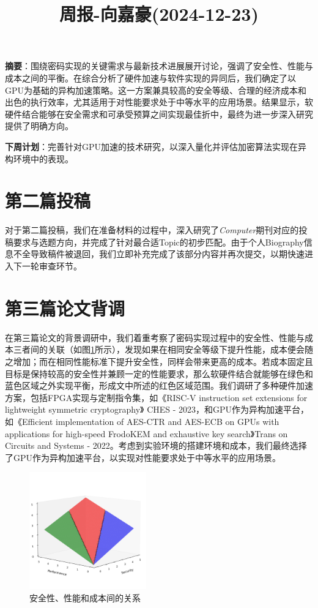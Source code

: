 \documentclass[11pt,a4paper]{article}
\title{周报-向嘉豪(2024-12-23)}
\renewcommand{\maketitle}{
  \begin{center}
    \LARGE\bfseries\thetitle
  \end{center}
}
\begin{document}
\maketitle

\noindent \textbf{摘要}：围绕密码实现的关键需求与最新技术进展展开讨论，强调了安全性、性能与成本之间的平衡。在综合分析了硬件加速与软件实现的异同后，我们确定了以GPU为基础的异构加速策略。这一方案兼具较高的安全等级、合理的经济成本和出色的执行效率，尤其适用于对性能要求处于中等水平的应用场景。结果显示，软硬件结合能够在安全需求和可承受预算之间实现最佳折中，最终为进一步深入研究提供了明确方向。

\vspace{1em}
\noindent \textbf{下周计划}：完善针对GPU加速的技术研究，以深入量化并评估加密算法实现在异构环境中的表现。

\section{第二篇投稿}
对于第二篇投稿，我们在准备材料的过程中，深入研究了\textit{Computer}期刊对应的投稿要求与选题方向，并完成了针对最合适Topic的初步匹配。由于个人Biography信息不全导致稿件被退回，我们立即补充完成了该部分内容并再次提交，以期快速进入下一轮审查环节。

\section{第三篇论文背调}
在第三篇论文的背景调研中，我们着重考察了密码实现过程中的安全性、性能与成本三者间的关联（如图\ref{fig:tradeoff}所示），发现如果在相同安全等级下提升性能，成本便会随之增加；而在相同性能标准下提升安全性，同样会带来更高的成本。若成本固定且目标是保持较高的安全性并兼顾一定的性能要求，那么软硬件结合就能够在绿色和蓝色区域之外实现平衡，形成文中所述的红色区域范围。我们调研了多种硬件加速方案，包括FPGA实现与定制指令集，如《RISC-V instruction set extensions for lightweight symmetric cryptography》 CHES - 2023，和GPU作为异构加速平台，如《Efficient implementation of AES-CTR and AES-ECB on GPUs with applications for high-speed FrodoKEM and exhaustive key search》Trans on Circuits and Systems - 2022。考虑到实验环境的搭建环境和成本，我们最终选择了GPU作为异构加速平台，以实现对性能要求处于中等水平的应用场景。

\begin{figure}[h]
    \centering
    \includegraphics[width=0.45\textwidth]{./fig/SPC_relation.png}
    \caption{安全性、性能和成本间的关系}
    \label{fig:tradeoff}
\end{figure}
\end{document}
